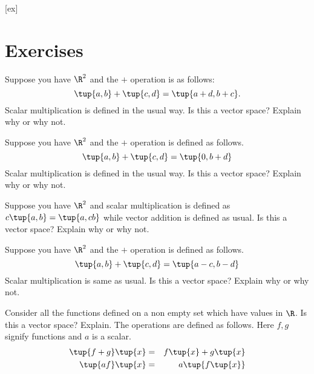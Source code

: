 [ex]
\section*{Exercises}

\begin{enumialphparenastyle}

\begin{ex} Suppose you have $\R^{2}$ and the $+$ operation is as
follows:\ 
\begin{equation*}
\tup{a,b} +\tup{c,d} =\tup{a+d,b+c} .
\end{equation*}
Scalar multiplication is defined in the usual way. Is this a vector space?
Explain why or why not. 
\end{ex}

\begin{ex} Suppose you have $\R^{2}$ and the $+$ operation is defined as
follows. 
\begin{equation*}
\tup{a,b} +\tup{c,d} =\tup{0,b+d}
\end{equation*}
Scalar multiplication is defined in the usual way. Is this a vector space?
Explain why or why not. 
\end{ex}

\begin{ex} Suppose you have $\R^{2}$ and scalar multiplication is defined
as $c\tup{a,b} =\tup{a,cb} $ while vector addition is
defined as usual. Is this a vector space? Explain why or why not.
\end{ex}

\begin{ex} Suppose you have $\R^{2}$ and the $+$ operation is defined as
follows. 
\begin{equation*}
\tup{a,b} +\tup{c,d} =\tup{a-c,b-d}
\end{equation*}
Scalar multiplication is same as usual. Is this a vector space? Explain why
or why not. 
\end{ex}

\begin{ex} \label{functions}Consider all the functions defined on a non empty set
which have values in $\R$. Is this a vector space? Explain.
The operations are defined as follows. Here $f,g$ signify functions and $a$
is a scalar. 
\begin{eqnarray*}
\tup{f+g} \tup{x} &=&f\tup{x} +g\tup{x} \\
\tup{af} \tup{x} &=&a\tup{f\tup{x} }
\end{eqnarray*}
\end{ex}



\end{enumialphparenastyle}

